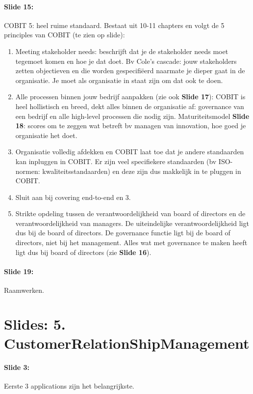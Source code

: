 \documentclass[10pt,a4paper]{report}
\begin{document}
\paragraph{Slide 15:}COBIT 5: heel ruime standaard. Bestaat uit 10-11 chapters en volgt de 5 principles van COBIT (te zien op slide):
\begin{enumerate}
\item Meeting stakeholder needs: beschrijft dat je de stakeholder needs moet tegemoet komen en hoe je dat doet. Bv Cole's cascade: jouw stakeholders zetten objectieven en die worden gespecifiëerd naarmate je dieper gaat in de organisatie. Je moet als organisatie in staat zijn om dat ook te doen.
\item Alle processen binnen jouw bedrijf aanpakken (zie ook \textbf{Slide 17}): COBIT is heel hollistisch en breed, dekt alles binnen de organisatie af: governance van een bedrijf en alle high-level processen die nodig zijn. Maturiteitsmodel \textbf{Slide 18}: scores om te zeggen wat betreft bv managen van innovation, hoe goed je organisatie het doet.
\item Organisatie volledig afdekken en COBIT laat toe dat je andere standaarden kan inpluggen in COBIT. Er zijn veel specifiekere standaarden (bv ISO-normen: kwaliteitsstandaarden) en deze zijn dus makkelijk in te pluggen in COBIT.
\item Sluit aan bij covering end-to-end en 3.
\item Strikte opdeling tussen de verantwoordelijkheid van board of directors en de verantwoordelijkheid van managers. De uiteindelijke verantwoordelijkheid ligt dus bij de board of directors. De governance functie ligt bij de board of directors, niet bij het management. Alles wat met governance te maken heeft ligt dus bij board of directors (zie \textbf{Slide 16}).
\end{enumerate}

\paragraph{Slide 19:}Raamwerken.

\section{Slides: 5. CustomerRelationShipManagement}

\paragraph{Slide 3:}Eerste 3 applications zijn het belangrijkste.
\end{document}

